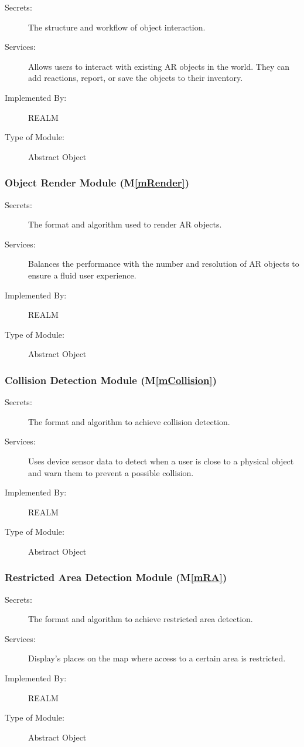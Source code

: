 \documentclass[12pt, titlepage]{article}
\newcommand{\mref}[1]{M\ref{#1}}
\begin{document}
\begin{description}
\item[Secrets:]The structure and workflow of object interaction.
\item[Services:]Allows users to interact with existing AR objects in the world. They can add reactions, report, or save the objects to their inventory.
\item[Implemented By:]REALM
\item[Type of Module:]Abstract Object
\end{description}

\subsubsection{Object Render Module (\mref{mRender})}

\begin{description}
\item[Secrets:]The format and algorithm used to render AR objects.
\item[Services:]Balances the performance with the number and resolution of AR objects to ensure a fluid user experience.
\item[Implemented By:]REALM
\item[Type of Module:]Abstract Object
\end{description}

\subsubsection{Collision Detection Module (\mref{mCollision})}

\begin{description}
\item[Secrets:]The format and algorithm to achieve collision detection.
\item[Services:]Uses device sensor data to detect when a user is close to a physical object and warn them to prevent a possible collision.
\item[Implemented By:]REALM
\item[Type of Module:]Abstract Object
\end{description}

\subsubsection{Restricted Area Detection Module (\mref{mRA})}

\begin{description}
\item[Secrets:]The format and algorithm to achieve restricted area detection.
\item[Services:]Display's places on the map where access to a certain area is restricted.
\item[Implemented By:]REALM
\item[Type of Module:]Abstract Object
\end{description}
\end{document}

